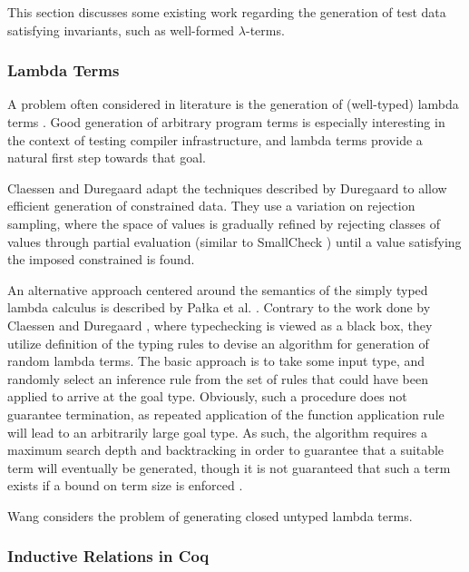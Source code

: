 \documentclass[a4paper,msc,twosized=semi]{uustthesis}
\begin{document}
    This section discusses some existing work regarding the generation of test data satisfying invariants, such as well-formed $\lambda$-terms. 

  \subsubsection{Lambda Terms} 

    A problem often considered in literature is the generation of (well-typed) lambda terms \cite{palka2011testing, grygiel2013counting, claessen2015generating}. Good generation of arbitrary program terms is especially interesting in the context of testing compiler infrastructure, and lambda terms provide a natural first step towards that goal. 

    Claessen and Duregaard \cite{claessen2015generating} adapt the techniques described by Duregaard \cite{duregaard2013feat} to allow efficient generation of constrained data. They use a variation on rejection sampling, where the space of values is gradually refined by rejecting classes of values through partial evaluation (similar to SmallCheck \cite{runciman2008smallcheck}) until a value satisfying the imposed constrained is found. 

    An alternative approach centered around the semantics of the simply typed lambda calculus is described by Pa{\l}ka et al. \cite{palka2011testing}. Contrary to the work done by Claessen and Duregaard \cite{claessen2015generating}, where typechecking is viewed as a black box, they utilize definition of the typing rules to devise an algorithm for generation of random lambda terms. The basic approach is to take some input type, and randomly select an inference rule from the set of rules that could have been applied to arrive at the goal type. Obviously, such a procedure does not guarantee termination, as repeated application of the function application rule will lead to an arbitrarily large goal type. As such, the algorithm requires a maximum search depth and backtracking in order to guarantee that a suitable term will eventually be generated, though it is not guaranteed that such a term exists if a bound on term size is enforced \cite{moczurad2000statistical}. 

    Wang \cite{wang2005generating} considers the problem of generating closed untyped lambda terms. 

  \subsubsection{Inductive Relations in Coq}
\end{document}
